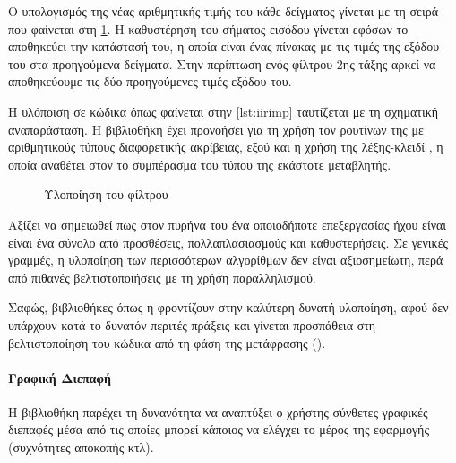 \documentclass[12pt]{extarticle}
\begin{document}
Ο υπολογισμός της νέας αριθμητικής τιμής του κάθε δείγματος γίνεται με 
τη σειρά που φαίνεται στη \cref{fig:iir_filter_block}. 
Η καθυστέρηση του σήματος εισόδου γίνεται εφόσων το 
αποθηκεύει την κατάστασή του, η οποία είναι ένας πίνακας με τις τιμές της εξόδου 
του στα προηγούμενα δείγματα. Στην περίπτωση ενός φίλτρου 2ης τάξης 
αρκεί να αποθηκεύουμε τις δύο προηγούμενες τιμές εξόδου του.

Η υλόποιση σε κώδικα όπως φαίνεται στην \cref{lst:iirimp} ταυτίζεται με τη σχηματική 
αναπαράσταση. Η βιβλιοθήκη  έχει προνοήσει για τη χρήση τον ρουτίνων 
της με αριθμητικούς τύπους διαφορετικής ακρίβειας, εξού και η χρήση της 
λέξης-κλειδί  \cite{CppReferenceAuto}, η οποία αναθέτει στον  το συμπέρασμα του τύπου 
της εκάστοτε μεταβλητής.

\begin{figure}
\centering
    
\caption{Υλοποίηση του  φίλτρου}
\label{fig:iir_filter_block}

\end{figure}

\begin{minipage}{\textwidth}
\end{minipage}

Αξίζει να σημειωθεί πως στον πυρήνα του ένα οποιοδήποτε  επεξεργασίας 
ήχου είναι είναι ένα σύνολο από προσθέσεις, πολλαπλασιασμούς και καθυστερήσεις. 
Σε γενικές γραμμές, η υλοποίηση των περισσότερων 
αλγορίθμων δεν είναι αξιοσημείωτη, περά από πιθανές βελτιστοποιήσεις με τη χρήση παραλληλισμού. 

Σαφώς, βιβλιοθήκες όπως η  φροντίζουν στην καλύτερη δυνατή υλοποίηση, 
αφού δεν υπάρχουν κατά το δυνατόν περιτές πράξεις και γίνεται προσπάθεια 
στη βελτιστοποίηση του κώδικα από τη φάση της μετάφρασης ().

\paragraph{Γραφική Διεπαφή}

\epigraph{}{}

Η βιβλιοθήκη  παρέχει τη δυνανότητα να αναπτύξει ο χρήστης 
σύνθετες γραφικές διεπαφές μέσα από τις οποίες μπορεί κάποιος να ελέγχει 
το  μέρος της εφαρμογής (συχνότητες αποκοπής κτλ).
\end{document}
